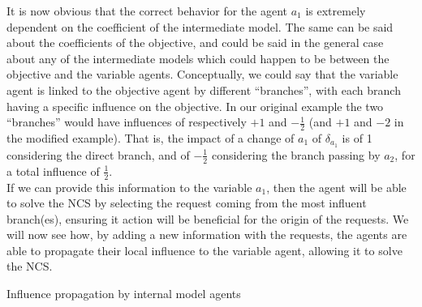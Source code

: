 It is now obvious that the correct behavior for the agent $a_1$ is extremely dependent on the coefficient of the intermediate model. The same can be said about the coefficients of the objective, and could be said in the general case about any of the intermediate models which could happen to be between the objective and the variable agents. Conceptually, we could say that the variable agent is linked to the objective agent by different \enquote{branches}, with each branch having a specific influence on the objective. In our original example the two \enquote{branches} would have influences of respectively $+1$ and $-\frac{1}{2}$ (and $+1$ and $-2$ in the modified example). That is, the impact of a change of $a_1$ of $\delta_{a_1}$ is of 1 considering the direct branch, and of $-\frac{1}{2}$ considering the branch passing by $a_2$, for a total influence of $\frac{1}{2}$.\\
If we can provide this information to the variable $a_1$, then the agent will be able to solve the NCS by selecting the request coming from the most influent branch(es), ensuring it action will be beneficial for the origin of the requests. We will now see how, by adding a new information with the requests, the agents are able to propagate their local influence to the variable agent, allowing it to solve the NCS.

\begin{algorithm}
\caption{Influence propagation by internal model agents}
\label{algo_hidden_dependency_influence_propagation}

	

\end{algorithm}


